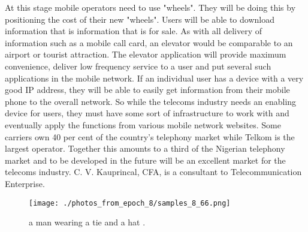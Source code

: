 \documentclass{article}%
\begin{document}
At this stage mobile operators need to use "wheels". They will be doing this by positioning the cost of their new "wheels". Users will be able to download information that is information that is for sale.\newline%
As with all delivery of information such as a mobile call card, an elevator would be comparable to an airport or tourist attraction. The elevator application will provide maximum convenience, deliver low frequency service to a user and put several such applications in the mobile network.\newline%
If an individual user has a device with a very good IP address, they will be able to easily get information from their mobile phone to the overall network.\newline%
So while the telecoms industry needs an enabling device for users, they must have some sort of infrastructure to work with and eventually apply the functions from various mobile network websites.\newline%
Some carriers own 40 per cent of the country's telephony market while Telkom is the largest operator. Together this amounts to a third of the Nigerian telephony market and to be developed in the future will be an excellent market for the telecoms industry.\newline%
C. V. Kauprincal, CFA, is a consultant to Telecommunication Enterprise.\newline%

%


\begin{figure}[h!]%
\centering%
\texttt{[image: ./photos\_from\_epoch\_8/samples\_8\_66.png]}%
\caption{a man wearing a tie and a hat .}%
\end{figure}

%
\end{document}
